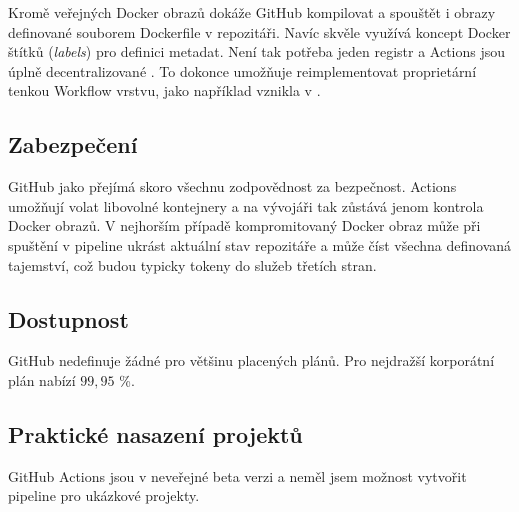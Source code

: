         Kromě veřejných Docker obrazů dokáže GitHub kompilovat a spouštět i obrazy definované souborem Dockerfile v repozitáři. Navíc skvěle využívá koncept Docker štítků (\textit{labels}) pro definici metadat. Není tak potřeba jeden registr a Actions jsou úplně decentralizované \cite{ga-labels}. To dokonce umožňuje reimplementovat proprietární tenkou Workflow vrstvu, jako například vznikla v  \cite{nektos-act}.

    \subsection{Zabezpečení}
        GitHub jako  přejímá skoro všechnu zodpovědnost za bezpečnost. Actions umožňují volat libovolné kontejnery a na vývojáři tak zůstává jenom kontrola Docker obrazů. V nejhorším případě kompromitovaný Docker obraz může při spuštění v pipeline ukrást aktuální stav repozitáře a může číst všechna definovaná tajemství, což budou typicky tokeny do služeb třetích stran.

    \subsection{Dostupnost}
        GitHub nedefinuje žádné  pro většinu placených plánů. Pro nejdražší korporátní plán nabízí  $99,95$ \%.

    \subsection{Praktické nasazení projektů}
        GitHub Actions jsou v neveřejné beta verzi a neměl jsem možnost vytvořit pipeline pro ukázkové projekty.
